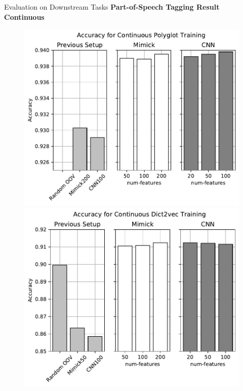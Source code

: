 \documentclass{beamer}
\begin{document}
\begin{frame}{Evaluation on Downstream Tasks}
    \textbf{Part-of-Speech Tagging Result Continuous}
    \begin{figure}[H]
        \centering
        \begin{minipage}{.48\textwidth}
            \includegraphics[width=\linewidth]{images/continuous_polyglot}
        \end{minipage}
        \begin{minipage}{.48\textwidth}
            \includegraphics[width=\linewidth]{images/continuous_dict2vec}
        \end{minipage}
    \end{figure}
\end{frame}
\end{document}
